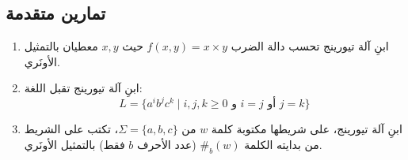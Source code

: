 \documentclass[14pt]{extarticle}
\begin{document}
\subsection{تمارين متقدمة}

\begin{enumerate}[resume]
    \item ابنِ آلة تيورينج تحسب دالة الضرب $f(x, y) = x \times y$ حيث $x, y$ معطيان بالتمثيل الأونَري.

    \item ابنِ آلة تيورينج تقبل اللغة:
    $$L = \{a^i b^j c^k \mid i, j, k \geq 0 \text{ و } i = j \text{ أو } j = k\}$$

    \item ابنِ آلة تيورينج، على شريطها مكتوبة كلمة $w$ من $\Sigma = \{a, b, c\}$، تكتب على الشريط من بدايته الكلمة $\#_b(w)$ (عدد الأحرف $b$ فقط) بالتمثيل الأونَري.
\end{enumerate}
\end{document}

